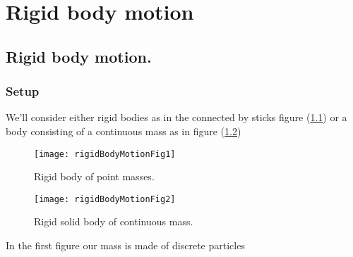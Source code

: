
%


\chapter{Rigid body motion}
\label{chap:rigidBodyMotion}
{}
\date{Mar 7, 2012}

\beginArtWithToc

\section{Rigid body motion.}

\subsection{Setup}

We'll consider either rigid bodies as in the connected by sticks figure (\ref{fig:rigidBodyMotion:rigidBodyMotionFig1}) or a body consisting of a continuous mass as in figure (\ref{fig:rigidBodyMotion:rigidBodyMotionFig2})

\begin{figure}[htp]
   \centering
   \texttt{[image: rigidBodyMotionFig1]}
   \caption{Rigid body of point masses.}\label{fig:rigidBodyMotion:rigidBodyMotionFig1}
\end{figure}

\begin{figure}[htp]
   \centering
   \texttt{[image: rigidBodyMotionFig2]}
   \caption{Rigid solid body of continuous mass.}\label{fig:rigidBodyMotion:rigidBodyMotionFig2}
\end{figure}

In the first figure our mass is made of discrete particles

